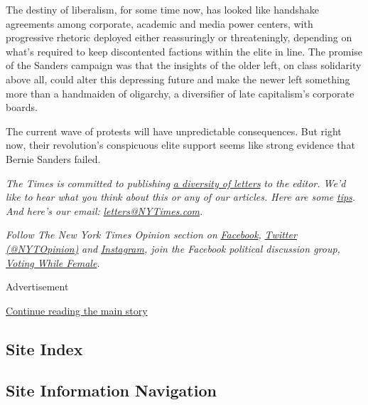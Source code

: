 The destiny of liberalism, for some time now, has looked like handshake
agreements among corporate, academic and media power centers, with
progressive rhetoric deployed either reassuringly or threateningly,
depending on what's required to keep discontented factions within the
elite in line. The promise of the Sanders campaign was that the insights
of the older left, on class solidarity above all, could alter this
depressing future and make the newer left something more than a
handmaiden of oligarchy, a diversifier of late capitalism's corporate
boards.

The current wave of protests will have unpredictable consequences. But
right now, their revolution's conspicuous elite support seems like
strong evidence that Bernie Sanders failed.

\emph{The Times is committed to publishing}
\href{https://www.nytimes3xbfgragh.onion/2019/01/31/opinion/letters/letters-to-editor-new-york-times-women.html}{\emph{a
diversity of letters}} \emph{to the editor. We'd like to hear what you
think about this or any of our articles. Here are some}
\href{https://help.nytimes3xbfgragh.onion/hc/en-us/articles/115014925288-How-to-submit-a-letter-to-the-editor}{\emph{tips}}\emph{.
And here's our email:}
\href{mailto:letters@NYTimes.com}{\emph{letters@NYTimes.com}}\emph{.}

\emph{Follow The New York Times Opinion section on}
\href{https://www.facebookcorewwwi.onion/nytopinion}{\emph{Facebook}}\emph{,}
\href{http://twitter.com/NYTOpinion}{\emph{Twitter (@NYTOpinion)}}
\emph{and}
\href{https://www.instagram.com/nytopinion/}{\emph{Instagram}}\emph{,
join the Facebook political discussion group,}
\href{https://www.facebookcorewwwi.onion/groups/votingwhilefemale/}{\emph{Voting
While Female}}\emph{.}

Advertisement

\protect\hyperlink{after-bottom}{Continue reading the main story}

\hypertarget{site-index}{%
\subsection{Site Index}\label{site-index}}

\hypertarget{site-information-navigation}{%
\subsection{Site Information
Navigation}\label{site-information-navigation}}

